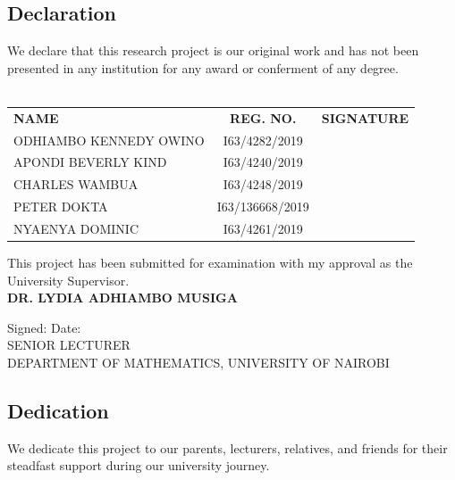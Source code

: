 \documentclass[11pt]{article}\usepackage[]{graphicx}\usepackage[]{xcolor}
\numberwithin{equation}{section}
\numberwithin{table}{section}
\begin{document}
	\subsection{Declaration}
	\noindent We declare that this research project is our original work and has not been presented in any institution for any award or conferment of any degree.\\\\
	
	\begin{tabular}{l c r }
		\vspace{0.5cm}
		\noindent
		\textbf{NAME} & \textbf{REG. NO.} & \textbf{SIGNATURE} \\
		\vspace{0.5cm}
		ODHIAMBO KENNEDY OWINO & I63/4282/2019 & \dotfill \\
		\vspace{0.5cm}
		APONDI BEVERLY KIND & I63/4240/2019 & \dotfill  \\
		\vspace{0.5cm}
		CHARLES WAMBUA & I63/4248/2019 & \dotfill \\
		\vspace{0.5cm}
		PETER DOKTA & I63/136668/2019 & \dotfill \\
		\vspace{0.5cm}
		NYAENYA DOMINIC & I63/4261/2019 & \dotfill \\
	\end{tabular}
	
	\noindent This project has been submitted for examination with my approval as the University Supervisor.\\
	
	\vspace{1cm}
	\noindent \textbf{DR. LYDIA ADHIAMBO MUSIGA}\\
	
	\vspace{0.5cm}
	
	\noindent Signed: \dotfill Date: \dotfill \\
	
	\noindent SENIOR LECTURER\\
	DEPARTMENT OF MATHEMATICS, UNIVERSITY OF NAIROBI
	
	\newpage
	
	\subsection{Dedication}
	
	We dedicate this project to our parents, lecturers, relatives, and friends for their steadfast support during our university journey.
	
\end{document}
